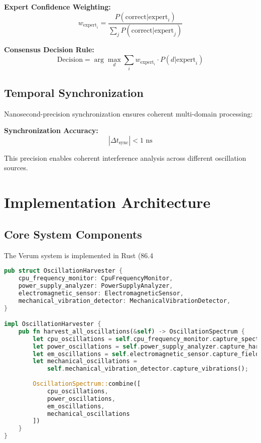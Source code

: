 \documentclass[11pt,a4paper]{article}
\begin{document}
\textbf{Expert Confidence Weighting:}
\begin{equation}
w_{\text{expert}_i} = \frac{P(\text{correct}|\text{expert}_i)}{\sum_{j} P(\text{correct}|\text{expert}_j)}
\end{equation}

\textbf{Consensus Decision Rule:}
\begin{equation}
\text{Decision} = \arg\max_d \sum_i w_{\text{expert}_i} \cdot P(d|\text{expert}_i)
\end{equation}

\subsection{Temporal Synchronization}

Nanosecond-precision synchronization ensures coherent multi-domain processing:

\textbf{Synchronization Accuracy:}
\begin{equation}
|\Delta t_{\text{sync}}| < 1 \text{ ns}
\end{equation}

This precision enables coherent interference analysis across different oscillation sources.

\section{Implementation Architecture}

\subsection{Core System Components}

The Verum system is implemented in Rust (86.4%

\begin{lstlisting}[language=Rust, caption=Oscillation Harvesting Interface]
pub struct OscillationHarvester {
    cpu_frequency_monitor: CpuFrequencyMonitor,
    power_supply_analyzer: PowerSupplyAnalyzer,
    electromagnetic_sensor: ElectromagneticSensor,
    mechanical_vibration_detector: MechanicalVibrationDetector,
}

impl OscillationHarvester {
    pub fn harvest_all_oscillations(&self) -> OscillationSpectrum {
        let cpu_oscillations = self.cpu_frequency_monitor.capture_spectrum();
        let power_oscillations = self.power_supply_analyzer.capture_harmonics();
        let em_oscillations = self.electromagnetic_sensor.capture_field();
        let mechanical_oscillations = 
            self.mechanical_vibration_detector.capture_vibrations();
        
        OscillationSpectrum::combine([
            cpu_oscillations,
            power_oscillations,
            em_oscillations,
            mechanical_oscillations
        ])
    }
}
\end{lstlisting}
\end{document}
